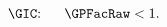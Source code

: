   \begin{equation}\begin{gathered}\begin{aligned}
        \text{\GIC:~~}  &&  \GPFacRaw  < 1. \phantom{/\PermGroFac}&  \phantom{\text{\GIC:~~}} \label{eq:GICRaw}
      \end{aligned}\end{gathered}\end{equation}
